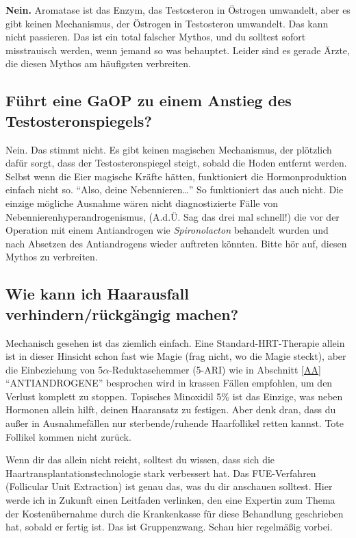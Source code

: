 \documentclass{article}
\begin{document}
{{{\textbf{Nein.} Aromatase ist das Enzym, das Testosteron in Östrogen umwandelt, aber es gibt keinen Mechanismus, der Östrogen in Testosteron umwandelt. Das kann nicht passieren. Das ist ein total falscher Mythos, und du solltest sofort misstrauisch werden, wenn jemand so was behauptet. Leider sind es gerade Ärzte, die diesen Mythos am häufigsten verbreiten.

\subsection{Führt eine GaOP zu einem Anstieg des Testosteronspiegels?}

Nein. Das stimmt nicht. Es gibt keinen magischen Mechanismus, der plötzlich dafür sorgt, dass der Testosteronspiegel steigt, sobald die Hoden entfernt werden. Selbst wenn die Eier magische Kräfte hätten, funktioniert die Hormonproduktion einfach nicht so. “Also, deine Nebennieren…” So funktioniert das auch nicht. Die einzige mögliche Ausnahme wären nicht diagnostizierte Fälle von Nebennierenhyperandrogenismus, (A.d.Ü. Sag das drei mal schnell!) die vor der Operation mit einem Antiandrogen wie \textit{Spironolacton} behandelt wurden und nach Absetzen des Antiandrogens wieder auftreten könnten. Bitte hör auf, diesen Mythos zu verbreiten.

\subsection{Wie kann ich Haarausfall verhindern/rückgängig machen?}\label{11-14}

Mechanisch gesehen ist das ziemlich einfach. Eine Standard-HRT-Therapie allein ist in dieser Hinsicht schon fast wie Magie (frag nicht, wo die Magie steckt), aber die Einbeziehung von 5$\alpha$-Reduktasehemmer (5-ARI) wie in Abschnitt \ref{AA} “ANTIANDROGENE” besprochen wird in krassen Fällen empfohlen, um den Verlust komplett zu stoppen. Topisches Minoxidil 5\% ist das Einzige, was neben Hormonen allein hilft, deinen Haaransatz zu festigen. Aber denk dran, dass du außer in Ausnahmefällen nur sterbende/ruhende Haarfollikel retten kannst. Tote Follikel kommen nicht zurück.

Wenn dir das allein nicht reicht, solltest du wissen, dass sich die Haartransplantationstechnologie stark verbessert hat. Das FUE-Verfahren (Follicular Unit Extraction) ist genau das, was du dir anschauen solltest. Hier werde ich in Zukunft einen Leitfaden verlinken, den eine Expertin zum Thema der Kostenübernahme durch die Krankenkasse für diese Behandlung geschrieben hat, sobald er fertig ist. Das ist Gruppenzwang. Schau hier regelmäßig vorbei.

}}}
\end{document}
